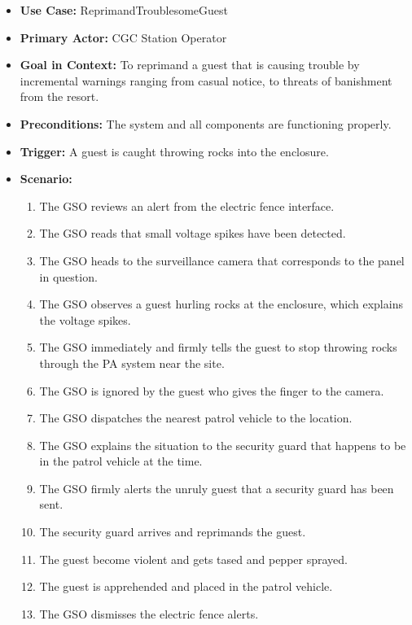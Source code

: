 \documentclass[12pt]{article}
\begin{document}
    \begin{itemize}
        \item[]\textbf{Use Case:}                                
            ReprimandTroublesomeGuest

        \item[]\textbf{Primary Actor:}
            CGC Station Operator

        \item[]\textbf{Goal in Context:}
            To reprimand a guest that is causing trouble by incremental warnings ranging from
            casual notice, to threats of banishment from the resort.

        \item[]\textbf{Preconditions:}
            The system and all components are functioning properly.

        \item[]\textbf{Trigger:}
            A guest is caught throwing rocks into the enclosure.
            
        \item[]\textbf{Scenario:}
            \begin{enumerate}
                \item The GSO reviews an alert from the electric fence interface.
                \item The GSO reads that small voltage spikes have been detected.
                \item The GSO heads to the surveillance camera that corresponds to the
                panel in question.
                \item The GSO observes a guest hurling rocks at the enclosure, which
                explains the voltage spikes.
                \item The GSO immediately and firmly tells the guest to stop throwing rocks
                through the PA system near the site.
                \item The GSO is ignored by the guest who gives the finger to the camera.
                \item The GSO dispatches the nearest patrol vehicle to the location.
                \item The GSO explains the situation to the security guard that happens 
                to be in the patrol vehicle at the time.
                \item The GSO firmly alerts the unruly guest that a security guard has been sent.
                \item The security guard arrives and reprimands the guest.
                \item The guest become violent and gets tased and pepper sprayed.
                \item The guest is apprehended and placed in the patrol vehicle.
                \item The GSO dismisses the electric fence alerts.
            \end{enumerate}


\end{itemize}
\end{document}
